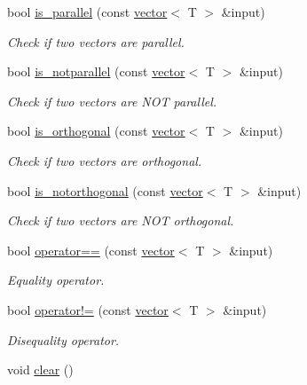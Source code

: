 \begin{DoxyCompactItemize}
bool \hyperlink{classddd_1_1vector_a3f3fe85b03fcdfdd2a8002900d35d3a3}{is\+\_\+parallel} (const \hyperlink{classddd_1_1vector}{vector}$<$ T $>$ \&input)
\begin{DoxyCompactList}\small\item\em Check if two vectors are parallel. \end{DoxyCompactList}\item 
bool \hyperlink{classddd_1_1vector_ae2d3c12f861cd1d4bb8977d0512a5e20}{is\+\_\+notparallel} (const \hyperlink{classddd_1_1vector}{vector}$<$ T $>$ \&input)
\begin{DoxyCompactList}\small\item\em Check if two vectors are N\+OT parallel. \end{DoxyCompactList}\item 
bool \hyperlink{classddd_1_1vector_a48546e7a818979326ebb22e9256a9070}{is\+\_\+orthogonal} (const \hyperlink{classddd_1_1vector}{vector}$<$ T $>$ \&input)
\begin{DoxyCompactList}\small\item\em Check if two vectors are orthogonal. \end{DoxyCompactList}\item 
bool \hyperlink{classddd_1_1vector_a7f96b8d4f26e95d3678b29ffb434d5e5}{is\+\_\+notorthogonal} (const \hyperlink{classddd_1_1vector}{vector}$<$ T $>$ \&input)
\begin{DoxyCompactList}\small\item\em Check if two vectors are N\+OT orthogonal. \end{DoxyCompactList}\item 
bool \hyperlink{classddd_1_1vector_a5f26a6f471c836b723c94a5f68a3931d}{operator==} (const \hyperlink{classddd_1_1vector}{vector}$<$ T $>$ \&input)
\begin{DoxyCompactList}\small\item\em Equality operator. \end{DoxyCompactList}\item 
bool \hyperlink{classddd_1_1vector_a83fb6aea4121e7737ab7642aae23e2df}{operator!=} (const \hyperlink{classddd_1_1vector}{vector}$<$ T $>$ \&input)
\begin{DoxyCompactList}\small\item\em Disequality operator. \end{DoxyCompactList}\item 
\mbox{\label{classddd_1_1point_ade1021a86b26ec7212cb83ebfd3b711f}} 
void \hyperlink{classddd_1_1point_ade1021a86b26ec7212cb83ebfd3b711f}{clear} ()

\end{DoxyCompactItemize}
